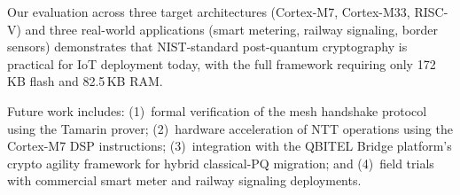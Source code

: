 \documentclass[conference,10pt]{IEEEtran}
\begin{document}
Our evaluation across three target architectures (Cortex-M7, Cortex-M33, RISC-V) and three real-world applications (smart metering, railway signaling, border sensors) demonstrates that NIST-standard post-quantum cryptography is practical for IoT deployment today, with the full framework requiring only 172\,KB flash and 82.5\,KB RAM.

Future work includes: (1)~formal verification of the mesh handshake protocol using the Tamarin prover; (2)~hardware acceleration of NTT operations using the Cortex-M7 DSP instructions; (3)~integration with the QBITEL Bridge platform's crypto agility framework for hybrid classical-PQ migration; and (4)~field trials with commercial smart meter and railway signaling deployments.



\end{document}
